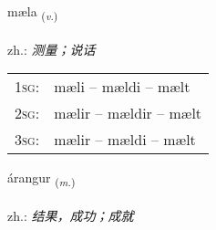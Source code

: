 \documentclass[frontgrid, backgrid]{flacards}\usepackage[]{graphicx}\usepackage[]{xcolor}
\begin{document}
\renewcommand{\flhead}{\vskip5pt \fboxsep=0pt {\small\bfseries\footnotesize Sagnorð | 动词}}
\renewcommand{\fcfoot}{\vskip5pt \fboxsep=0pt \hspace{2pt}{\small\bfseries\footnotesize 1K}}

\renewcommand{\blhead}{\vskip5pt {\small\bfseries\footnotesize Sagnorð | 动词 }}
\renewcommand{\bcfoot}{\vskip5pt \hspace{2pt}{\small\bfseries\footnotesize 1K}}


{mæla \small{\textsubscript{(\textit{v.})}} \\[1ex] %
\textphonetic{[maiːla]} \\
zh.: \emph{测量；说话} \\  [2ex]
\renewcommand*{\arraystretch}{0.8}
\begin{tabular}{p{1cm}l}
\textsc{1sg}: & mæli -- mældi -- mælt \\ 
\textsc{2sg}: & mælir -- mældir -- mælt \\ 
\textsc{3sg}: & mælir -- mældi -- mælt \\ 
\end{tabular}
}

\renewcommand{\flhead}{\vskip5pt \fboxsep=0pt {\small\bfseries\footnotesize Nafnorð | 名词}}
\renewcommand{\fcfoot}{\vskip5pt \fboxsep=0pt \hspace{2pt}{\small\bfseries\footnotesize 1K}}

\renewcommand{\blhead}{\vskip5pt {\small\bfseries\footnotesize Nafnorð | 名词 }}
\renewcommand{\bcfoot}{\vskip5pt \hspace{2pt}{\small\bfseries\footnotesize 1K}}


{árangur \small{\textsubscript{(\textit{m.})}} \\[1ex] %
\textphonetic{[auːrauŋkʏr]} \\
zh.: \emph{结果，成功；成就} \\  [2ex]
\renewcommand*{\arraystretch}{0.8}
}
\end{document}
